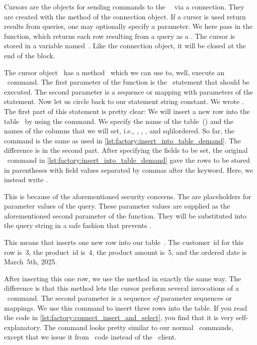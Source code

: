 Cursors are the objects for sending commands to the \postgresql\ \server\ via a connection.
They are created with the  method of the connection object.
If a curser is used return results from queries, one may optionally specify a  parameter.
We here pass in the  function, which returns each row resulting from a query as a .
The cursor is stored in a variable named~.
Like the connection object, it will be closed at the end of the  block.%
%
\begin{sloppypar}%
The cursor object~ has a method~ which we can use to, well, execute an \sql\ command.
The first parameter of the function is the \sql\ statement that should be executed.
The second parameter is a sequence or mapping with parameters of the statement.
Now let us circle back to our statement string constant.
We wrote .
The first part of this statement is pretty clear:
We will insert a new row into the table~ by using the  command.
We specify the name of the table~() and the names of the columns that we will set, i.e., , , , and sqlil{ordered}.
So far, the command is the same as used in \cref{lst:factory:insert_into_table_demand}.
The difference is in the second part.
After specifying the fields to be set, the original \sql\ command in \cref{lst:factory:insert_into_table_demand} gave the rows to be stored in parentheses with field values separated by commas after the  keyword.
Here, we instead write .%
\end{sloppypar}%
%
This is because of the aforementioned security concerns.
The  are placeholders for parameter values of the query.
These parameter values are supplied as the aforementioned second parameter of the  function.
They will be substituted into the query string in a safe fashion that prevents .

This means that  inserts one new row into our table~.
The customer~id for this row is~3, the product~id is~4, the product amount is~5, and the ordered date is March~5th, 2025.

After inserting this one row, we use the  method in exactly the same way.
The difference is that this method lets the cursor perform several invocations of a \sql\ command.
The second parameter is a sequence \emph{of} parameter sequences or mappings.
We use this command to insert three rows into the  table.
If you read the code in \cref{lst:factory:connect_insert_and_select}, you find that it is very self-explanatory.
The command looks pretty similar to our normal \sql\ commands, except that we issue it from \python\ code instead of the \psql\ client.

